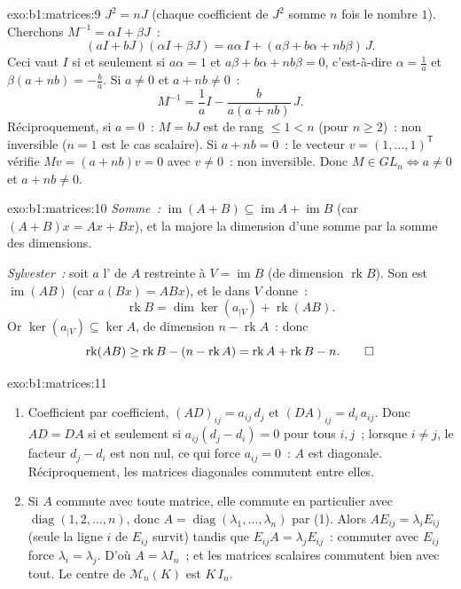 \begin{solution}{exo:b1:matrices:9}
$J^2 = nJ$ (chaque coefficient de $J^2$ somme $n$ fois le nombre $1$).
Cherchons $M^{-1} = \alpha I + \beta J$~:
\[
(aI + bJ)(\alpha I + \beta J)
= a\alpha\, I + (a\beta + b\alpha + nb\beta)\, J .
\]
Ceci vaut $I$ si et seulement si $a\alpha = 1$ et $a\beta + b\alpha +
nb\beta = 0$, c'est-à-dire $\alpha = \frac1a$ et $\beta(a + nb) =
-\frac ba$. Si $a \neq 0$ et $a + nb \neq 0$~:
\[
M^{-1} = \frac 1a I - \frac{b}{a(a + nb)}\, J .
\]
Réciproquement, si $a = 0$~: $M = bJ$ est de rang $\leq 1 < n$ (pour $n
\geq 2$)~: non inversible ($n = 1$ est le cas scalaire). Si $a + nb =
0$~: le vecteur $v = (1, \dots, 1)^{\mathsf T}$ vérifie $Mv = (a +
nb)v = 0$ avec $v \neq 0$~: non inversible. Donc $M \in GL_n \iff a
\neq 0$ et $a + nb \neq 0$.
\end{solution}

\begin{solution}{exo:b1:matrices:10}
\emph{Somme~:} $\operatorname{im}(A + B) \subseteq \operatorname{im} A
+ \operatorname{im} B$ (car $(A+B)x = Ax + Bx$), et la  majore la dimension d'une somme par la somme des dimensions.

\emph{Sylvester~:} soit $a$ l' de $A$ restreinte à $V =
\operatorname{im} B$ (de dimension $\operatorname{rk} B$). Son  est
$\operatorname{im}(AB)$ (car $a(Bx) = ABx$), et le 
dans $V$ donne~:
\[
\operatorname{rk} B = \dim\ker(a_{|V}) + \operatorname{rk}(AB) .
\]
Or $\ker(a_{|V}) \subseteq \ker A$, de dimension $n -
\operatorname{rk} A$~: donc
\[
\operatorname{rk}(AB) \geq \operatorname{rk} B - (n -
\operatorname{rk} A) = \operatorname{rk} A + \operatorname{rk} B -
n . \qedhere
\]
\end{solution}

\begin{solution}{exo:b1:matrices:11}
\begin{enumerate}
  \item Coefficient par coefficient, $(AD)_{ij} = a_{ij}\,d_j$ et
        $(DA)_{ij} = d_i\,a_{ij}$. Donc $AD = DA$ si et seulement si
        $a_{ij}(d_j - d_i) = 0$ pour tous $i, j$~; lorsque $i \neq j$,
        le facteur $d_j - d_i$ est non nul, ce qui force $a_{ij} = 0$~:
        $A$ est diagonale. Réciproquement, les matrices diagonales
        commutent entre elles.
  \item Si $A$ commute avec toute matrice, elle commute en
        particulier avec $\operatorname{diag}(1, 2, \dots, n)$, donc
        $A = \operatorname{diag}(\lambda_1, \dots, \lambda_n)$ par (1).
        Alors $A E_{ij} = \lambda_i E_{ij}$ (seule la ligne $i$ de
        $E_{ij}$ survit) tandis que $E_{ij} A = \lambda_j E_{ij}$~:
        commuter avec $E_{ij}$ force $\lambda_i = \lambda_j$.
        D'où $A = \lambda I_n$~; et les matrices scalaires commutent
        bien avec tout. Le centre de $\mathcal{M}_n(K)$ est
        $K\,I_n$.
\end{enumerate}
\end{solution}

